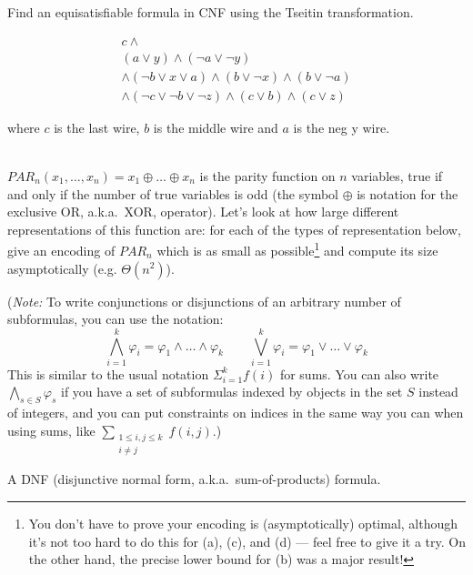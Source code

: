 \documentclass[11pt]{article}
\begin{document}
\begin{qunlist}
\begin{qparts}
  \item
    Find an equisatisfiable formula in CNF using the Tseitin transformation.

    \begin{answer}
      \begin{equation}
        \begin{split}
          c \land \\
          (a \lor y) \land (\lnot a \lor \lnot y) \\
          \land (\lnot b \lor x \lor a) \land (b \lor \lnot x) \land (b \lor \lnot a) \\
          \land (\lnot c \lor \lnot b \lor \lnot z) \land (c \lor b) \land (c \lor z)
        \end{split}
      \end{equation}

      where \(c\) is the last wire, \(b\) is the middle wire and \(a\) is the neg y wire.
    \end{answer}
  \end{qparts}

  \\
  $PAR_n(x_1, \dots, x_n) = x_1 \oplus \dots \oplus x_n$ is the parity function on $n$ variables, true if and only if the number of true variables is odd (the symbol $\oplus$ is notation for the exclusive OR, a.k.a.~XOR, operator).
  Let's look at how large different representations of this function are: for each of the types of representation below, give an encoding of $PAR_n$ which is as small as possible\footnote{You don't have to prove your encoding is (asymptotically) optimal, although it's not too hard to do this for (a), (c), and (d) --- feel free to give it a try. On the other hand, the precise lower bound for (b) was a major result!} and compute its size asymptotically (e.g. $\Theta(n^2)$).

  (\emph{Note:} To write conjunctions or disjunctions of an arbitrary number of subformulas, you can use the notation:
    \[
      \bigwedge_{i=1}^k \varphi_i = \varphi_1 \land \dots \land \varphi_k \qquad \bigvee_{i=1}^k \varphi_i = \varphi_1 \lor \dots \lor \varphi_k
    \]
    This is similar to the usual notation $\Sigma_{i=1}^k f(i)$ for sums.
  You can also write $\bigwedge_{s \in S} \varphi_s$ if you have a set of subformulas indexed by objects in the set $S$ instead of integers, and you can put constraints on indices in the same way you can when using sums, like $\sum_{\substack{1 \le i, j \le k\\i \ne j}} f(i,j)$.)
  \begin{qparts}
  \item
    A DNF (disjunctive normal form, a.k.a.~sum-of-products) formula.


\end{qparts}
\end{qunlist}
\end{document}
